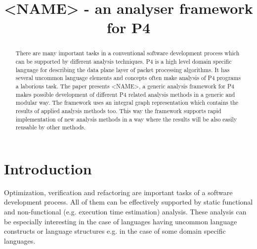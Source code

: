 \documentclass[sigconf]{acmart}
\begin{document}
	
	
	\title{<NAME> - an analyser framework for P4}
	
	
	\author{}
	\email{}
	\orcid{}
	\author{}
	\authornotemark[]
	\email{}
	\affiliation{%
		\institution{}
		\streetaddress{}
		\city{}
		\state{}
		\country{}
		\postcode{}
	}
	
	
	\begin{abstract}
		There are many important tasks in a conventional software development process which can be supported by different analysis techniques. P4 is a high level domain specific language for
describing the data plane layer of packet processing algorithms. It has several uncommon language elements and concepts often make analysis of P4 programs a laborious task. 
The paper presents <NAME>, a generic analysis framework for P4 makes possible development of different P4 related analysis methods in a generic and modular way. The framework uses an integral graph representation which contains the results of applied analysis methods too. This way the framework supports rapid implementation of new analysis methods in a way where the results will be also easily reusable by other methods. 

	\end{abstract}
	

	
	
	
	\maketitle
	
	\section{Introduction}
	  Optimization, verification and refactoring are important tasks of a software development process. All of them can be effectively supported by static functional and non-functional (e.g. execution time estimation) analysis. These analysis can be especially interesting in the case of languages having uncommon language constructs or language structures e.g. in the case of some domain specific languages. 
	
\end{document}

